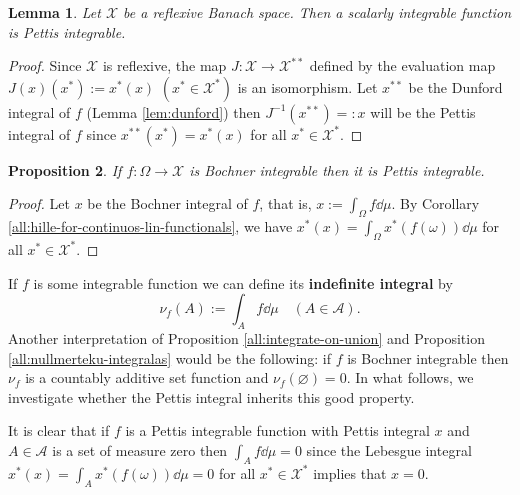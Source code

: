\documentclass[a4paper, 12pt]{article}
\newtheorem{lem}{Lemma}[section]
\newtheorem{state}[lem]{Proposition}
\begin{document}
\begin{lem} Let $\mathcal{X}$ be a reflexive Banach space. Then a scalarly integrable function is Pettis integrable.
\end{lem}
\begin{proof} Since $\mathcal{X}$ is reflexive, the map $J \colon \mathcal{X} \to \mathcal{X}^{**}$ defined by the evaluation map $J(x)(x^*) := x^*(x)$ $(x^* \in \mathcal{X}^*)$ is an isomorphism. Let $x^{**}$ be the Dunford integral of $f$ (Lemma \ref{lem:dunford}) then $J^{-1}(x^{**})=:x$ will be the Pettis integral of $f$ since $x^{**}(x^*)=x^*(x)$ for all $x^* \in \mathcal{X}^*$.
\end{proof}
\begin{state}\label{all:bochner-integrability-implies-pettis} If $f\colon\Omega \to \mathcal{X}$ is Bochner integrable then it is Pettis integrable.
\end{state}
\begin{proof} Let $x$ be the Bochner integral of $f$, that is, $x := \int_{\Omega} f \dd{\mu}$. By Corollary \ref{all:hille-for-continuos-lin-functionals}, we have $x^*(x) = \int_{\Omega} x^*(f(\omega)) \dd{\mu}$ for all $x^* \in \mathcal{X}^*$.
\end{proof}
If $f$ is some integrable function we can define its \textbf{indefinite integral} by
$$
\nu_{f}(A) := \int_{A} f \dd{\mu} \quad (A \in \mathcal{A}).
$$
Another interpretation of Proposition \ref{all:integrate-on-union} and Proposition \ref{all:nullmerteku-integralas} would be the following: if $f$ is Bochner integrable then $\nu_f$ is a countably additive set function and $\nu_f(\varnothing) = 0$.  In what follows, we investigate whether the Pettis integral inherits this good property. 

It is clear that if $f$ is a Pettis integrable function with Pettis integral $x$ and $A \in \mathcal{A}$ is a set of measure zero then $\int_{A} f \dd{\mu} = 0$ since the Lebesgue integral $x^*(x) = \int_{A} x^*(f(\omega)) \dd{\mu} = 0$ for all $x^* \in \mathcal{X}^{*}$ implies that $x = 0$. 
\end{document}
